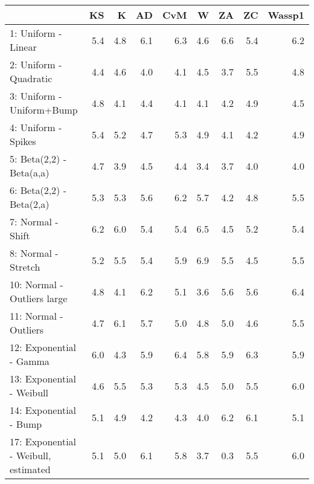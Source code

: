 \documentclass[
]{article}
\begin{document}
\begin{table}[H]
\centering\begingroup\fontsize{15}{17}\selectfont

\begin{tabular}{l|r|r|r|r|r|r|r|r}
\hline
  & KS & K & AD & CvM & W & ZA & ZC & Wassp1\\
\hline
1: Uniform - Linear & 5.4 & 4.8 & 6.1 & 6.3 & 4.6 & 6.6 & 5.4 & 6.2\\
\hline
2: Uniform - Quadratic & 4.4 & 4.6 & 4.0 & 4.1 & 4.5 & 3.7 & 5.5 & 4.8\\
\hline
3: Uniform - Uniform+Bump & 4.8 & 4.1 & 4.4 & 4.1 & 4.1 & 4.2 & 4.9 & 4.5\\
\hline
4: Uniform - Spikes & 5.4 & 5.2 & 4.7 & 5.3 & 4.9 & 4.1 & 4.2 & 4.9\\
\hline
5: Beta(2,2) - Beta(a,a) & 4.7 & 3.9 & 4.5 & 4.4 & 3.4 & 3.7 & 4.0 & 4.0\\
\hline
6: Beta(2,2) - Beta(2,a) & 5.3 & 5.3 & 5.6 & 6.2 & 5.7 & 4.2 & 4.8 & 5.5\\
\hline
7: Normal - Shift & 6.2 & 6.0 & 5.4 & 5.4 & 6.5 & 4.5 & 5.2 & 5.4\\
\hline
8: Normal  - Stretch & 5.2 & 5.5 & 5.4 & 5.9 & 6.9 & 5.5 & 4.5 & 5.5\\
\hline
10: Normal  - Outliers large & 4.8 & 4.1 & 6.2 & 5.1 & 3.6 & 5.6 & 5.6 & 6.4\\
\hline
11: Normal  - Outliers & 4.7 & 6.1 & 5.7 & 5.0 & 4.8 & 5.0 & 4.6 & 5.5\\
\hline
12: Exponential - Gamma & 6.0 & 4.3 & 5.9 & 6.4 & 5.8 & 5.9 & 6.3 & 5.9\\
\hline
13: Exponential - Weibull & 4.6 & 5.5 & 5.3 & 5.3 & 4.5 & 5.0 & 5.5 & 6.0\\
\hline
14: Exponential - Bump & 5.1 & 4.9 & 4.2 & 4.3 & 4.0 & 6.2 & 6.1 & 5.1\\
\hline
17: Exponential - Weibull, estimated & 5.1 & 5.0 & 6.1 & 5.8 & 3.7 & 0.3 & 5.5 & 6.0\\
\hline
\end{tabular}
\endgroup{}
\end{table}
\end{document}

